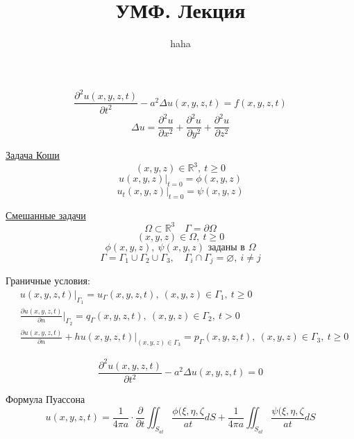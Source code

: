 \documentclass[a4paper]{article}
\begin{document}
\title{УМФ. Лекция}
\author{haha}
\maketitle

\begin{equation}
    \frac{\partial^2 u(x,y,z,t)}{\partial t^2} - a^2 \Delta u(x,y,z,t) = f(x,y,z,t)
\end{equation}
\[
    \Delta u = \frac{\partial^2 u}{\partial x^2} 
    + \frac{\partial^2 u}{\partial y^2} + \frac{\partial^2 u}{\partial z^2}
\]

\underline{Задача Коши}
\[
    (x,y,z) \in \mathbb{R}^3, \ t \geq 0   
\]
\begin{equation}
    u(x,y,z) |_{t=0} = \phi(x,y,z)
\end{equation}
\begin{equation}
    u_t(x,y,z) |_{t=0} = \psi(x,y,z)
\end{equation}

\underline{Смешанные задачи}
\[
    \Omega \subset \mathbb{R}^3 \quad \Gamma = \partial \Omega
\]
\[
    (x,y,z) \in \Omega, \ t \geq 0
\]
\[
    \phi(x,y,z), \ \psi(x,y,z) \text{ заданы в } \Omega
\]
\[
    \Gamma = \Gamma_1 \cup \Gamma_2 \cup \Gamma_3, \quad \Gamma_i \cap \Gamma_j
    = \varnothing, \ i \neq j
\]

Граничные условия:
\begin{subequations}
    \begin{align}
        &u(x,y,z,t) |_{\Gamma_1} = u_{\Gamma}(x,y,z,t), \ (x,y,z) \in \Gamma_1, \ t \geq 0\\
        &\frac{\partial u(x,y,z,t)}{\partial n} |_{\Gamma_2} = q_{\Gamma}(x,y,z,t),
        \ (x,y,z) \in \Gamma_2, \ t > 0 \\
        &\frac{\partial u(x,y,z,t)}{\partial n} + hu(x,y,z,t)|_{(x,y,z) \in \Gamma_3}
        = p_{\Gamma}(x,y,z,t) , \ (x,y,z) \in \Gamma_3, \ t \geq 0
    \end{align}
\end{subequations}

\begin{equation}
    \frac{\partial^2 u(x,y,z,t)}{\partial t^2} - a^2 \Delta u(x,y,z,t) = 0
\end{equation}

Формула Пуассона
\[
    u(x,y,z,t) = \frac{1}{4 \pi a} \cdot \frac{\partial }{\partial t} 
    \iint_{S_{at}} \frac{\phi(\xi, \eta, \zeta}{at} dS + \frac{1}{4 \pi a} 
    \iint_{S_{at}} \frac{\psi(\xi, \eta, \zeta}{at} dS
\]
\end{document}
